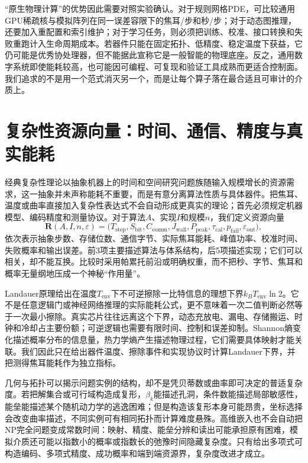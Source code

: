 “原生物理计算”的优势因此需要对照实验确认。对于规则网格PDE，可比较通用GPU稀疏核与模拟阵列在同一误差容限下的焦耳/步和秒/步；对于动态图推理，还要加入重配置和索引维护；对于学习任务，则必须把训练、校准、接口转换和失败重跑计入生命周期成本。若器件只能在固定拓扑、低精度、稳定温度下获益，它仍可能是优秀协处理器，但不能据此宣称它是一般智能的物理底座。反之，通用数字系统即使能耗较高，也可能因可编程、可复现和验证工具成熟而更适合控制面。我们追求的不是用一个范式消灭另一个，而是让每个算子落在最合适且可审计的介质上。

\section{复杂性资源向量：时间、通信、精度与真实能耗}
\label{sec:complexity_remapping}

经典复杂性理论以抽象机器上的时间和空间研究问题族随输入规模增长的资源需求，这一抽象并未声称能耗不重要，而是有意分离算法性质与具体器件。把焦耳、温度或曲率直接加入复杂性表达式不会自动形成更真实的理论；首先必须规定机器模型、编码精度和测量协议。对于算法$A$、实现$I$和规模$n$，我们定义资源向量
\[
\mathbf R(A,I,n,\varepsilon)=
\bigl(T_{\mathrm{step}},S_{\mathrm{bit}},C_{\mathrm{comm}},
J_{\mathrm{wall}},P_{\mathrm{peak}},\tau_{\mathrm{cal}},
p_{\mathrm{fail}},\varepsilon_{\mathrm{out}}\bigr),
\]
依次表示抽象步数、存储位数、通信字节、实际焦耳能耗、峰值功率、校准时间、失败概率和输出误差。前3项主要描述算法与体系结构，后5项描述实现；它们可以相关，却不能互换。比较时采用帕累托前沿或明确权重，而不把秒、字节、焦耳和概率无量纲地压成一个神秘“作用量”。

Landauer原理给出在温度$T_{\mathrm{env}}$下不可逆擦除一比特信息的理想下界$k_BT_{\mathrm{env}}\ln2$。它不是任意逻辑门或神经网络推理的实际能耗公式，更不意味着一次二值判断必然等于一次最小擦除。真实芯片往往远离这个下界，动态充放电、漏电、存储搬运、时钟和冷却占主要份额；可逆逻辑也需要有限时间、控制和误差抑制。Shannon熵变化描述概率分布的信息量，热力学熵产生描述物理过程，它们需要具体映射才能关联。我们因此只在给出器件温度、擦除事件和实现协议时计算Landauer下界，并把测得焦耳能耗作为独立指标。

几何与拓扑可以揭示问题实例的结构，却不是凭贝蒂数或曲率即可决定的普适复杂度。若把解集合或可行域构造成复形，$\beta_k$能描述孔洞，条件数能描述局部敏感性，能垒能描述某个随机动力学的逃逸困难；但是构造该复形本身可能昂贵，坐标选择会改变曲率描述，不同实例可有相同拓扑而计算难度悬殊。高维嵌入也不会自动把NP完全问题变成常数时间：映射、精度、能垒分辨和读出可能承担原有困难，模拟介质还可能以指数小的概率或指数长的弛豫时间隐藏复杂度。只有给出多项式可构造编码、多项式精度、成功概率和端到端资源界，复杂度改进才成立。

